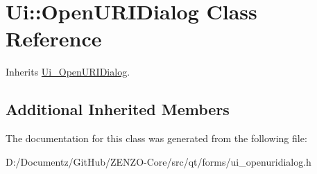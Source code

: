 \hypertarget{class_ui_1_1_open_u_r_i_dialog}{}\section{Ui\+::Open\+U\+R\+I\+Dialog Class Reference}
\label{class_ui_1_1_open_u_r_i_dialog}


Inherits \mbox{\hyperlink{class_ui___open_u_r_i_dialog}{Ui\+\_\+\+Open\+U\+R\+I\+Dialog}}.

\subsection*{Additional Inherited Members}


The documentation for this class was generated from the following file\+:\begin{DoxyCompactItemize}
\item 
D\+:/\+Documentz/\+Git\+Hub/\+Z\+E\+N\+Z\+O-\/\+Core/src/qt/forms/ui\+\_\+openuridialog.\+h\end{DoxyCompactItemize}
